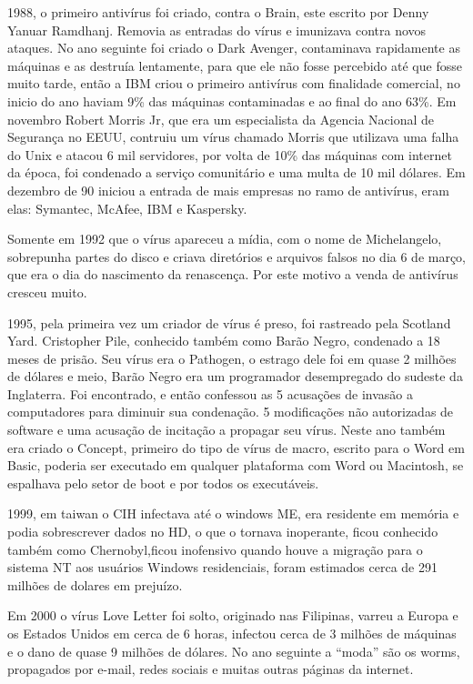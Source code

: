 	1988, o primeiro antivírus foi criado, contra o Brain, este escrito por Denny Yanuar Ramdhanj. Removia as entradas do vírus e imunizava contra novos ataques. No ano seguinte foi criado o Dark Avenger, contaminava rapidamente as máquinas e as destruía lentamente, para que ele não fosse percebido até que fosse muito tarde, então a IBM criou o primeiro antivírus com finalidade comercial, no inicio do ano haviam 9\% das máquinas contaminadas e ao final do ano 63\%. Em novembro Robert Morris Jr, que era um especialista da Agencia Nacional de Segurança no EEUU, contruiu um vírus chamado Morris que utilizava uma falha do Unix e atacou 6 mil servidores, por volta de 10\% das máquinas com internet da época, foi condenado a serviço comunitário e uma multa de 10 mil dólares. Em dezembro de 90 iniciou a entrada de mais empresas no ramo de antivírus, eram elas: Symantec, McAfee, IBM e Kaspersky.


	Somente em 1992 que o vírus apareceu a mídia, com o nome de Michelangelo, sobrepunha partes do disco e criava diretórios e arquivos falsos no dia 6 de março, que era o dia do nascimento da renascença. Por este motivo a venda de antivírus cresceu muito.


	1995, pela primeira vez um criador de vírus é preso, foi rastreado pela Scotland Yard. Cristopher Pile, conhecido também como Barão Negro, condenado a 18 meses de prisão. Seu vírus era o Pathogen, o estrago dele foi em quase 2 milhões de dólares e meio, Barão Negro era um programador desempregado do sudeste da Inglaterra. Foi encontrado, e então confessou as 5 acusações de invasão a computadores para diminuir sua condenação. 5 modificações não autorizadas de software e uma acusação de incitação a propagar seu vírus. Neste ano também era criado o Concept, primeiro do tipo de vírus de macro, escrito para o Word em Basic, poderia ser executado em qualquer plataforma com Word ou Macintosh, se espalhava pelo setor de boot e por todos os executáveis.


	1999, em taiwan  o CIH infectava até o windows ME, era residente em memória e podia sobrescrever dados no HD, o que o tornava inoperante, ficou conhecido também como Chernobyl,ficou inofensivo quando houve a migração para o sistema NT aos usuários Windows residenciais, foram estimados cerca de 291 milhões de dolares em prejuízo.


	Em 2000 o vírus Love Letter foi solto, originado nas Filipinas, varreu a Europa e os Estados Unidos em cerca de 6 horas, infectou cerca de 3 milhões de máquinas e o dano de quase 9 milhões de dólares. No ano seguinte a “moda” são os worms, propagados por e-mail, redes sociais e muitas outras páginas da internet.


